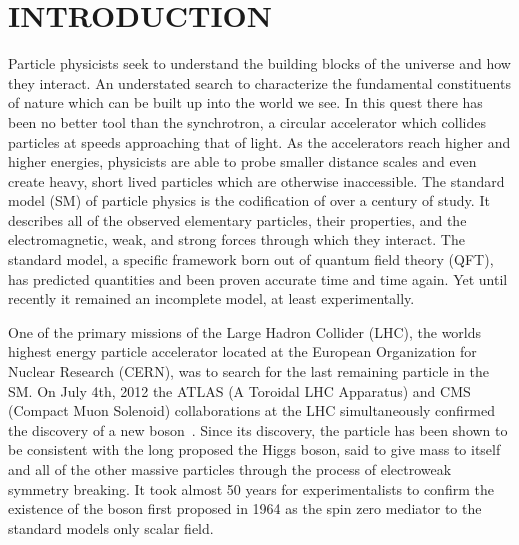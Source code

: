 %
%
%



\pagestyle{plain} %
\setcounter{page}{1}


\chapter{\uppercase {Introduction}}
\begin{comment}
1) Physics/colliders
2) Standard model
3) Higgs
4) This dissertation toppic
5) Organization
\end{comment}

Particle physicists seek to understand the building blocks of the universe and how they interact.
An understated search to characterize the fundamental constituents of nature which can be built up into the world we see.
In this quest there has been no better tool than the synchrotron, a circular accelerator which collides particles at speeds approaching that of light.
As the accelerators reach higher and higher energies, physicists are able to probe smaller distance scales and even create heavy, short lived particles which are otherwise inaccessible.
The standard model (SM) of particle physics is the codification of over a century of study.
It describes all of the observed elementary particles, their properties, and the electromagnetic, weak, and strong forces through which they interact.
The standard model, a specific framework born out of quantum field theory (QFT), has predicted quantities and been proven accurate time and time again.
Yet until recently it remained an incomplete model, at least experimentally.

One of the primary missions of the Large Hadron Collider (LHC), the worlds highest energy particle accelerator located at the European Organization for Nuclear Research (CERN), was to search for the last remaining particle in the SM.
On July 4th, 2012 the ATLAS (A Toroidal LHC Apparatus) and CMS (Compact Muon Solenoid) collaborations at the LHC simultaneously confirmed the discovery of a new boson~\cite{20121,201230}.
Since its discovery, the particle has been shown to be consistent with the long proposed the Higgs boson, said to give mass to itself and all of the other massive particles through the process of electroweak symmetry breaking.
It took almost 50 years for experimentalists to confirm the existence of the boson first proposed in 1964 as the spin zero mediator to the standard models only scalar field.

